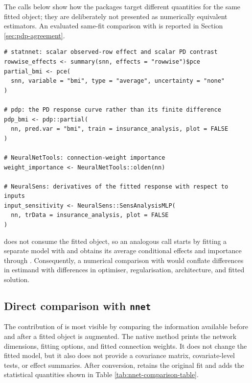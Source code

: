 The calls below show how the packages target different quantities for the same fitted  object; they are deliberately not presented as numerically equivalent estimators.
An evaluated same-fit comparison with  is reported in Section \ref{sec:pdp-agreement}.

\begin{verbatim}
# statnnet: scalar observed-row effect and scalar PD contrast
rowwise_effects <- summary(snn, effects = "rowwise")$pce
partial_bmi <- pce(
  snn, variable = "bmi", type = "average", uncertainty = "none"
)

# pdp: the PD response curve rather than its finite difference
pdp_bmi <- pdp::partial(
  nn, pred.var = "bmi", train = insurance_analysis, plot = FALSE
)

# NeuralNetTools: connection-weight importance
weight_importance <- NeuralNetTools::olden(nn)

# NeuralSens: derivatives of the fitted response with respect to inputs
input_sensitivity <- NeuralSens::SensAnalysisMLP(
  nn, trData = insurance_analysis, plot = FALSE
)
\end{verbatim}

 does not consume the fitted  object, so an analogous call starts by fitting a separate model with  and obtains its average conditional effects and importance through .
Consequently, a numerical comparison with  would conflate differences in estimand with differences in optimiser, regularisation, architecture, and fitted solution.

\subsection{\texorpdfstring{Direct comparison with \texttt{nnet}}{Direct comparison with nnet}}\label{direct-comparison-with-nnet}

The contribution of  is most visible by comparing the information available before and after a fitted  object is augmented.
The native  method prints the network dimensions, fitting options, and fitted connection weights.
It does not change the fitted model, but it also does not provide a covariance matrix, covariate-level tests, or effect summaries.
After conversion,  retains the original fit and adds the statistical quantities shown in Table \ref{tab:nnet-comparison-table}.

